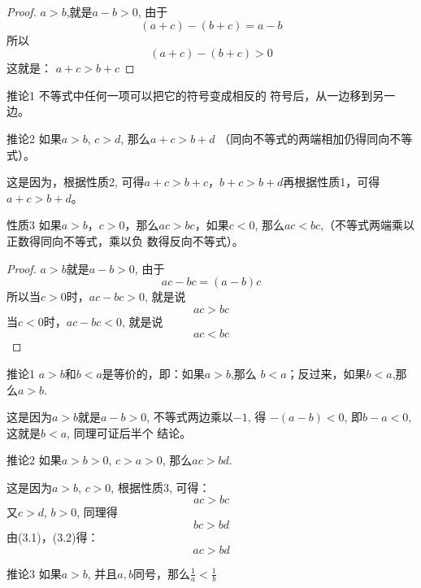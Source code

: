 \begin{proof}
    $a>b$,就是$a-b>0$,
    由于
    $$(a+c)-(b+c)=a-b$$
    所以
    $$(a+c)-(b+c)>0$$
    这就是：
$a+c>b+c$
\end{proof}

\begin{blk}{推论1}
不等式中任何一项可以把它的符号变成相反的
符号后，从一边移到另一边。

\end{blk}

\begin{blk}{推论2}
    如果$a>b$, $c>d$, 那么$a+c>b+d$ （同向不等式的两端相加仍得同向不等式）。
    \end{blk}

这是因为，根据性质2, 可得$a+c>b+c$，$b+c>b+
d$再根据性质1，可得$a+c>b+d$。

\begin{blk}{性质3}
如果$a>b$，$c>0$，那么$ac>bc$，如果$c<0$,
那么$ac<bc$,（不等式两端乘以正数得同向不等式，乘以负
数得反向不等式）。
\end{blk}

\begin{proof}
$a>b$就是$a-b>0$,
由于
$$ac-bc=(a-b)c$$
所以当$c>0$时，$ac-bc>0$, 就是说
$$ac>bc$$
当$c<0$时，$ac-bc<0$, 就是说
$$ac<bc$$
\end{proof}

\begin{blk}{推论1}
   $a>b$和$b<a$是等价的，即：如果$a>b$,那么
$b<a$；反过来，如果$b<a$,那么$a>b$.
\end{blk}

这是因为$a>b$就是$a-b>0$, 不等式两边乘以$-1$, 得
$-(a-b)<0$, 即$b-a<0$, 这就是$b<a$, 同理可证后半个
结论。

\begin{blk}{推论2}
    如果$a>b>0$, $c>a>0$, 那么$ac>bd$.
\end{blk}

 
这是因为$a>b$, $c>0$, 根据性质3, 可得：
\begin{equation}
    ac>bc
\end{equation}
又$c>d$, $b>0$, 同理得
\begin{equation}
    bc>bd
\end{equation}
由(3.1)，(3.2)得：
\begin{equation*}
    ac>bd  \tag{性质1}
\end{equation*}

\begin{blk}{推论3}
    如果$a>b$, 并且$a,b$同号，那么$\frac{1}{a}<\frac{1}{b}$
\end{blk}

